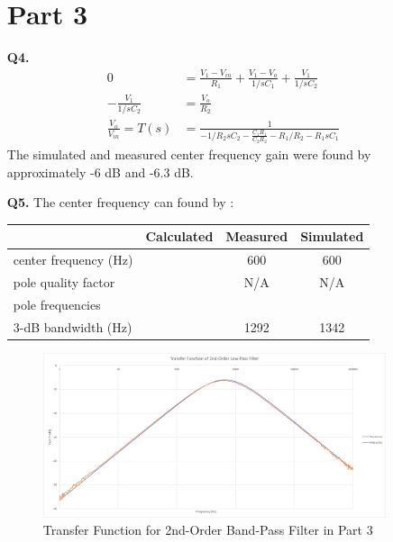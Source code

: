 \documentclass[12pt]{article}
\begin{document}
\begin{itemize}
    \section*{Part 3}
    \item [\textbf{Q4.}]
    \begin{equation*}
    \begin{aligned}
        0 &= \frac{V_1-V_{in}}{R_1} + \frac{V_1-V_o}{1/sC_1} + \frac{V_1}{1/sC_2} \\
        -\frac{V_1}{1/sC_2} &= \frac{V_o}{R_2} \\
        \frac{V_o}{V_{in}} = T(s) &= \frac{1}{-1/R_2sC_2 - \frac{C_1R_1}{C_2R_2}-R_1/R_2 - R_1sC_1}
    \end{aligned}
    \end{equation*}
    The simulated and measured center frequency gain were found by approximately -6 dB and -6.3 dB.
    \item [\textbf{Q5.}]
    The center frequency can found by :
    \begin{table}[ht]
        \centering
        \begin{tabular}{l|c|c|c|}
        \cline{2-4}
        & \multicolumn{1}{c|}{Calculated} & \multicolumn{1}{c|}{Measured} & Simulated \\ \hline
        \multicolumn{1}{|l|}{center frequency (Hz)}    &                                 & 600                              & 600           \\ \hline
        \multicolumn{1}{|l|}{pole quality factor} &                                 & N/A                            & N/A          \\ \hline
        \multicolumn{1}{|l|}{pole frequencies}    &                                 &                               &            \\ \hline
        \multicolumn{1}{|l|}{3-dB bandwidth (Hz)}      &                                 &   1292                            &    1342       \\ \hline
        \end{tabular}
        \end{table}
    \begin{figure}[ht]
        \centering
        \includegraphics[width=0.95\textwidth]{Q3}
        \caption{\label{fig:Q1}Transfer Function for 2nd-Order Band-Pass Filter in Part 3}
    \end{figure} \newpage
\end{itemize}
\end{document}
